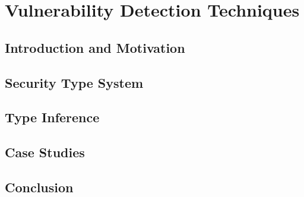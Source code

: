 
\chapter{Vulnerability Detection Techniques} \label{ch:vul_detect}

\section{Introduction and Motivation}

\section{Security Type System}


\section{Type Inference}

\section{Case Studies}

\section{Conclusion}
